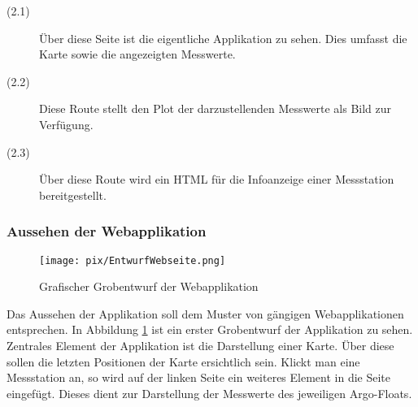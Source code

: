 \begin{description}
 \item [(2.1)]
 Über diese Seite ist die eigentliche Applikation zu sehen. Dies umfasst die Karte sowie die angezeigten Messwerte.

 \item [(2.2)]
 Diese Route stellt den Plot der darzustellenden Messwerte als Bild zur Verfügung.

 \item [(2.3)]
 Über diese Route wird ein HTML für die Infoanzeige einer Messstation bereitgestellt.

\end{description}



\subsubsection{Aussehen der Webapplikation}
%
%

\begin{figure}[h!]
    \centering
    \texttt{[image: pix/EntwurfWebseite.png]}
    \caption{Grafischer Grobentwurf der Webapplikation}
    \label{fig:entwurf_webseite}
\end{figure}

Das Aussehen der Applikation soll dem Muster von gängigen Webapplikationen entsprechen. In Abbildung \ref{fig:entwurf_webseite} ist ein erster Grobentwurf der Applikation zu sehen.
Zentrales Element der Applikation ist die Darstellung einer Karte. Über diese sollen die letzten Positionen der Karte ersichtlich sein.
Klickt man eine Messstation an, so wird auf der linken Seite ein weiteres Element in die Seite eingefügt. Dieses dient zur Darstellung der Messwerte des jeweiligen Argo-Floats.





